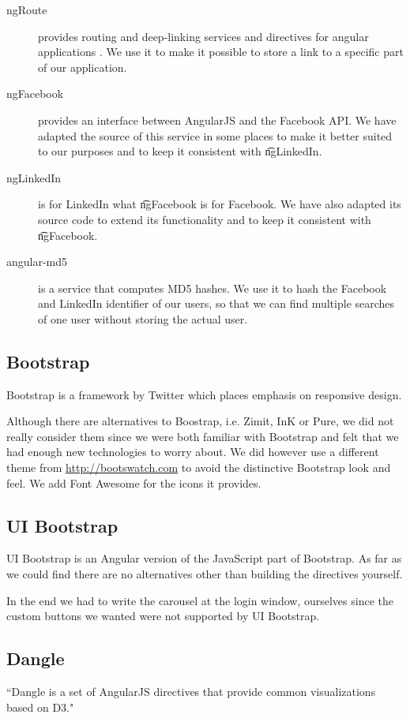 		\begin{description}
			\item[ngRoute] provides routing and deep-linking services and directives for angular applications \cite{angulardocsngRoute}. We use it to make it possible to store a link to a specific part of our application. 
			\item[ngFacebook] provides an interface between AngularJS and the Facebook API. We have adapted the source of this service in some places to make it better suited to our purposes and to keep it consistent with \t{ngLinkedIn}.
			\item[ngLinkedIn] is for LinkedIn what \t{ngFacebook} is for Facebook. We have also adapted its source code to extend its functionality and to keep it consistent with \t{ngFacebook}.
			\item[angular-md5] is a service that computes MD5 hashes. We use it to hash the Facebook and LinkedIn identifier of our users, so that we can find multiple searches of one user without storing the actual user. 
		\end{description}

\subsection{Bootstrap}
\label{ssec:1:bootstrap}
	Bootstrap is a framework by Twitter which places emphasis on responsive design. 

	Although there are alternatives to Boostrap, i.e. Zimit, InK or Pure, we did not really consider them since we were both familiar with Bootstrap and felt that we had enough new technologies to worry about. We did however use a different theme from \url{http://bootswatch.com} to avoid the distinctive Bootstrap look and feel. We add Font Awesome for the icons it provides. 

\subsection{UI Bootstrap}
\label{ssec:1:bootstrapUI}
	UI Bootstrap is an Angular version of the JavaScript part of Bootstrap. As far as we could find there are no alternatives other than building the directives yourself. 

	In the end we had to write the carousel at the login window, ourselves since the custom buttons we wanted were not supported by UI Bootstrap.

\subsection{Dangle}
\label{ssec:1:dangle}
	``Dangle is a set of AngularJS directives that provide common visualizations based on D3."\cite{dangle}

